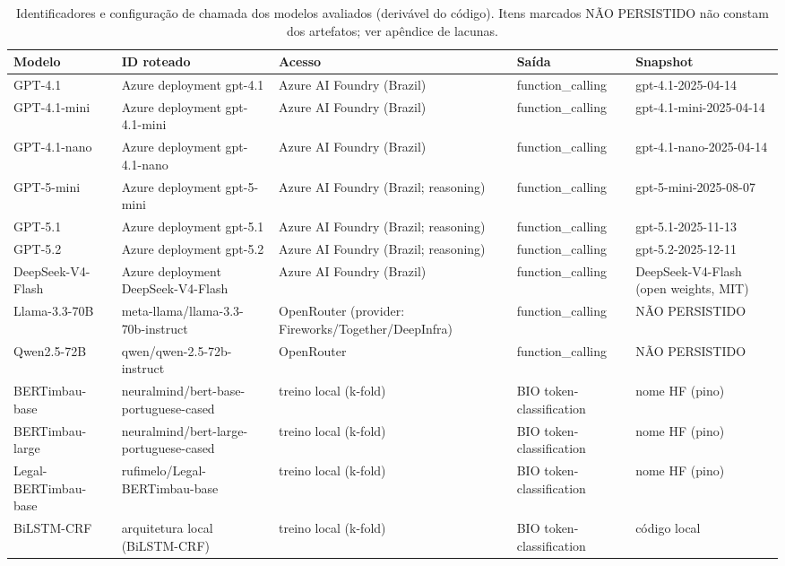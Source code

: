 \begin{table}[ht]
    \centering
    \caption{Identificadores e configuração de chamada dos modelos avaliados (derivável do código). Itens marcados NÃO PERSISTIDO não constam dos artefatos; ver apêndice de lacunas.}
    \label{tab:reprodutibilidade_modelos}
    \scriptsize
    \begin{tabular}{lllll}
        \hline
        \textbf{Modelo} & \textbf{ID roteado} & \textbf{Acesso} & \textbf{Saída} & \textbf{Snapshot} \\
        \hline
        GPT-4.1 & Azure deployment gpt-4.1 & Azure AI Foundry (Brazil) & function\_calling & gpt-4.1-2025-04-14 \\
        GPT-4.1-mini & Azure deployment gpt-4.1-mini & Azure AI Foundry (Brazil) & function\_calling & gpt-4.1-mini-2025-04-14 \\
        GPT-4.1-nano & Azure deployment gpt-4.1-nano & Azure AI Foundry (Brazil) & function\_calling & gpt-4.1-nano-2025-04-14 \\
        GPT-5-mini & Azure deployment gpt-5-mini & Azure AI Foundry (Brazil; reasoning) & function\_calling & gpt-5-mini-2025-08-07 \\
        GPT-5.1 & Azure deployment gpt-5.1 & Azure AI Foundry (Brazil; reasoning) & function\_calling & gpt-5.1-2025-11-13 \\
        GPT-5.2 & Azure deployment gpt-5.2 & Azure AI Foundry (Brazil; reasoning) & function\_calling & gpt-5.2-2025-12-11 \\
        DeepSeek-V4-Flash & Azure deployment DeepSeek-V4-Flash & Azure AI Foundry (Brazil) & function\_calling & DeepSeek-V4-Flash (open weights, MIT) \\
        Llama-3.3-70B & meta-llama/llama-3.3-70b-instruct & OpenRouter (provider: Fireworks/Together/DeepInfra) & function\_calling & NÃO PERSISTIDO \\
        Qwen2.5-72B & qwen/qwen-2.5-72b-instruct & OpenRouter & function\_calling & NÃO PERSISTIDO \\
        BERTimbau-base & neuralmind/bert-base-portuguese-cased & treino local (k-fold) & BIO token-classification & nome HF (pino) \\
        BERTimbau-large & neuralmind/bert-large-portuguese-cased & treino local (k-fold) & BIO token-classification & nome HF (pino) \\
        Legal-BERTimbau-base & rufimelo/Legal-BERTimbau-base & treino local (k-fold) & BIO token-classification & nome HF (pino) \\
        BiLSTM-CRF & arquitetura local (BiLSTM-CRF) & treino local (k-fold) & BIO token-classification & código local \\
        \hline
    \end{tabular}
\end{table}
